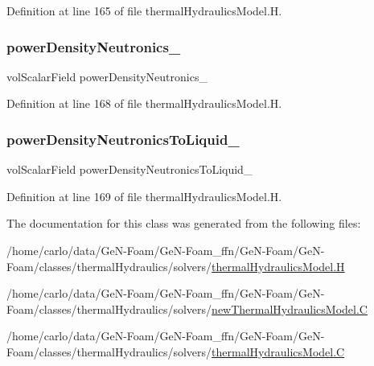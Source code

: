 Definition at line 165 of file thermal\+Hydraulics\+Model.\+H.

\mbox{\label{classFoam_1_1thermalHydraulicsModel_ad596330a3a089673ef489c991dba8d30}} 
\subsubsection{\texorpdfstring{power\+Density\+Neutronics\+\_\+}{powerDensityNeutronics\_}}
{\footnotesize\ttfamily vol\+Scalar\+Field power\+Density\+Neutronics\+\_\+\hspace{0.3cm}{\ttfamily [protected]}}



Definition at line 168 of file thermal\+Hydraulics\+Model.\+H.

\mbox{\label{classFoam_1_1thermalHydraulicsModel_a2d2d2a1eceb33ae3d23c1231cf598f40}} 
\subsubsection{\texorpdfstring{power\+Density\+Neutronics\+To\+Liquid\+\_\+}{powerDensityNeutronicsToLiquid\_}}
{\footnotesize\ttfamily vol\+Scalar\+Field power\+Density\+Neutronics\+To\+Liquid\+\_\+\hspace{0.3cm}{\ttfamily [protected]}}



Definition at line 169 of file thermal\+Hydraulics\+Model.\+H.



The documentation for this class was generated from the following files\+:\begin{DoxyCompactItemize}
\item 
/home/carlo/data/\+Ge\+N-\/\+Foam/\+Ge\+N-\/\+Foam\+\_\+ffn/\+Ge\+N-\/\+Foam/\+Ge\+N-\/\+Foam/classes/thermal\+Hydraulics/solvers/\hyperlink{thermalHydraulicsModel_8H}{thermal\+Hydraulics\+Model.\+H}\item 
/home/carlo/data/\+Ge\+N-\/\+Foam/\+Ge\+N-\/\+Foam\+\_\+ffn/\+Ge\+N-\/\+Foam/\+Ge\+N-\/\+Foam/classes/thermal\+Hydraulics/solvers/\hyperlink{newThermalHydraulicsModel_8C}{new\+Thermal\+Hydraulics\+Model.\+C}\item 
/home/carlo/data/\+Ge\+N-\/\+Foam/\+Ge\+N-\/\+Foam\+\_\+ffn/\+Ge\+N-\/\+Foam/\+Ge\+N-\/\+Foam/classes/thermal\+Hydraulics/solvers/\hyperlink{thermalHydraulicsModel_8C}{thermal\+Hydraulics\+Model.\+C}\end{DoxyCompactItemize}
